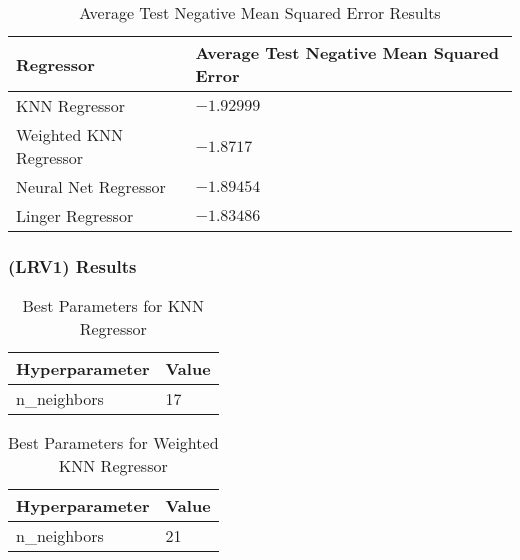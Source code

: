 \documentclass[a4paper, 12pt]{report}
\begin{document}
\begin{table}[H]
    \centering
    \caption{Average Test Negative Mean Squared Error Results}
    \label{tab:average_results_test_Abalone}
    \begin{tabular}{|l|l|}
    \hline
    \textbf{Regressor} & \textbf{Average Test Negative Mean Squared Error} \\ \hline
    KNN Regressor & $-1.92999$ \\ \hline
    Weighted KNN Regressor & $-1.8717$ \\ \hline
    Neural Net Regressor & $-1.89454$ \\ \hline
    Linger Regressor & $-1.83486$ \\ \hline
    \end{tabular}
\end{table}

\subsubsection{(LRV1) Results}
\begin{table}[H]
    \centering
    \caption{Best Parameters for KNN Regressor}
    \label{tab:best_parameters_knn_LRV1_Abalone}
    \begin{tabular}{|l|l|}
    \hline
    \textbf{Hyperparameter} & \textbf{Value} \\ \hline
    n\_neighbors & 17 \\ \hline
    \end{tabular}
\end{table}

\begin{table}[H]
    \centering
    \caption{Best Parameters for Weighted KNN Regressor}
    \label{tab:best_parameters_weighted_knn_LRV1_Abalone}
    \begin{tabular}{|l|l|}
    \hline
    \textbf{Hyperparameter} & \textbf{Value} \\ \hline
    n\_neighbors & 21 \\ \hline
    \end{tabular}
\end{table}
\end{document}
